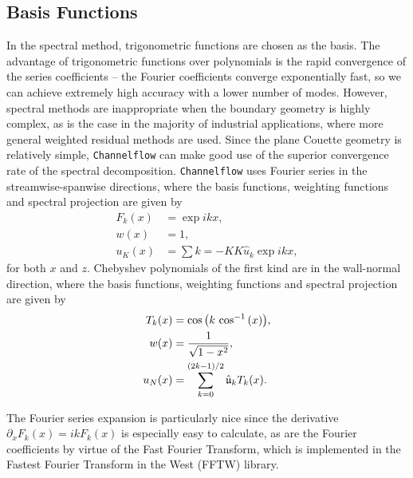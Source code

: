 \subsection{Basis Functions}

In the spectral method, trigonometric functions are chosen as the basis. The advantage of trigonometric functions over polynomials is the rapid convergence of the series coefficients -- the Fourier coefficients converge exponentially fast, so we can achieve extremely high accuracy with a lower number of modes. However, spectral methods are inappropriate when the boundary geometry is highly complex, as is the case in the majority of industrial applications, where more general weighted residual methods are used. Since the plane Couette geometry is relatively simple, {\tt Channelflow} can make good use of the superior convergence rate of the spectral decomposition. {\tt Channelflow} uses Fourier series in the streamwise-spanwise directions, where the basis functions, weighting functions and spectral projection are given by 
\begin{align}
F_k(x) &= \exp{ikx},\\
w(x) &= 1,\\
u_K(x) &= \sum{k=-K}{K}\hat{u}_k\exp{ikx},
\end{align}
for both $x$ and $z$. Chebyshev polynomials of the first kind are in the wall-normal direction, where the basis functions, weighting functions and spectral projection are given by
\begin{align}
T_k(x) &= \cos{k\textrm{ cos}^{-1}\paren{x}},\\
w(x) &= \frac{1}{\sqrt{1-x^2}}, \\
u_N(x) &= \sum{k=0}{(2k-1)/2}\hat{\mathfrak{u}}_kT_k(x).
\end{align}
\par The Fourier series expansion is particularly nice since the derivative $\partial_x F_k(x) = ikF_k(x)$ is especially easy to calculate, as are the Fourier coefficients by virtue of the Fast Fourier Transform, which is implemented in the Fastest Fourier Transform in the West (FFTW) library.\\

